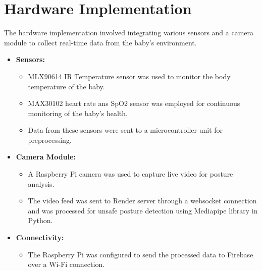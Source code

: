 \documentclass[12pt,a4paper]{report}
\begin{document}
\section{Hardware Implementation}
The hardware implementation involved integrating various sensors and a camera module to collect real-time data from the baby's environment.
\begin{itemize}
  \item \textbf{Sensors:}
  \begin{itemize}
    \item MLX90614 IR Temperature sensor was used to monitor the body temperature of the baby.
    \item MAX30102 heart rate ans SpO2 sensor was employed for continuous monitoring of the baby’s health.
    \item Data from these sensors were sent to a microcontroller unit for preprocessing.
  \end{itemize}
  \item \textbf{Camera Module:}
  \begin{itemize}
    \item A Raspberry Pi camera was used to capture live video for posture analysis.
    \item The video feed was sent to Render server through a websocket connection and was processed for unsafe posture detection using Mediapipe library in Python.
  \end{itemize}
  \item \textbf{Connectivity:}
  \begin{itemize}
    \item The Raspberry Pi was configured to send the processed data to Firebase over a Wi-Fi connection.
  \end{itemize}
\end{itemize}
\end{document}
